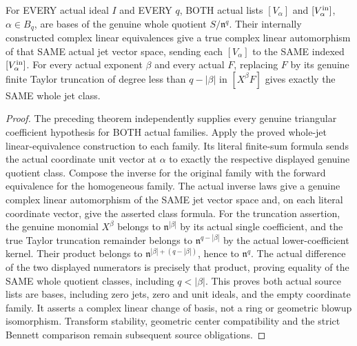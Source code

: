 \begin{theorem}
\label{hir:actual-finite-jet-original-initial-vertex-bases}
For EVERY actual ideal $I$ and EVERY $q$, BOTH actual lists
$[V_\alpha]$ and $[V^{\rm in}_\alpha]$, $\alpha\in B_q$, are bases
of the genuine whole quotient $S/\mathfrak n^q$.
Their internally constructed complex linear equivalences give a true
complex linear automorphism of that SAME actual jet vector space,
sending each $[V_\alpha]$ to the SAME indexed $[V^{\rm in}_\alpha]$.
For every actual exponent $\beta$ and every actual $F$, replacing $F$
by its genuine finite Taylor truncation of degree less than $q-|\beta|$
in $[X^\beta F]$ gives exactly the SAME whole jet class.
\leanok
\end{theorem}
\begin{proof}
The preceding theorem independently supplies every genuine triangular
coefficient hypothesis for BOTH actual families. Apply the proved
whole-jet linear-equivalence construction to each family. Its literal
finite-sum formula sends the actual coordinate unit vector at $\alpha$
to exactly the respective displayed genuine quotient class.
Compose the inverse for the original family with the forward equivalence
for the homogeneous family. The actual inverse laws give a genuine
complex linear automorphism of the SAME jet vector space and, on each
literal coordinate vector, give the asserted class formula.
For the truncation assertion, the genuine monomial $X^\beta$ belongs
to $\mathfrak n^{|\beta|}$ by its actual single coefficient, and
the true Taylor truncation remainder belongs to
$\mathfrak n^{q-|\beta|}$ by the actual lower-coefficient kernel.
Their product belongs to $\mathfrak n^{|\beta|+(q-|\beta|)}$, hence
to $\mathfrak n^q$. The actual difference of the two displayed
numerators is precisely that product, proving equality of the SAME
whole quotient classes, including $q<|\beta|$.
This proves both actual source lists are bases, including zero jets,
zero and unit ideals, and the empty coordinate family. It asserts a
complex linear change of basis, not a ring or geometric blowup
isomorphism. Transform stability, geometric center compatibility and
the strict Bennett comparison remain subsequent source obligations.
\end{proof}
